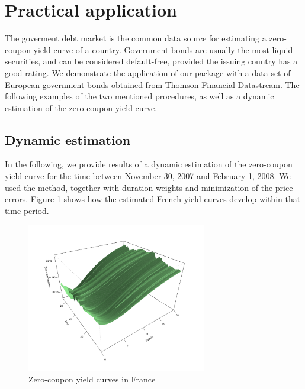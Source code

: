 \section{Practical application}
\label{sec:pract-appl}

The goverment debt market is the common data source for estimating a zero-coupon yield curve of a country. Government bonds are usually the most liquid securities, and can be considered default-free, provided the issuing country has a good rating. We demonstrate the application of our package with a data set of European government bonds obtained from Thomson Financial Datastream. The following examples of the two mentioned procedures, as well as a dynamic estimation of the zero-coupon yield curve.




\subsection{Dynamic estimation}

In the following, we provide results of a dynamic estimation of the zero-coupon yield curve for the time between November 30, 2007 and February 1, 2008. We used the \cite{Svensson1994} method, together with duration weights and minimization of the price errors. Figure \ref{fig:3dplot} shows how the estimated French yield curves develop within that time period.

\begin{figure}[htb]
  \begin{center}
  \caption{Zero-coupon yield curves in France}
  \label{fig:3dplot}
\includegraphics[width=0.7\textwidth]{3dplot}
\end{center}
\end{figure}

